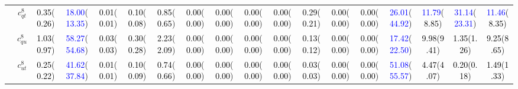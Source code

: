 \documentclass{article}
\begin{document}
\begin{landscape}
\begin{table}[H]
\begin{tabular}{|c|c|c|c|c|c|c|c|c|c|c|c|c|c|c|c|c|c|}
 & $c_{qt}^{8}$ & \textcolor{black}{0.35}(\textcolor{black}{0.26}) & \textcolor{blue}{18.00}(\textcolor{blue}{13.35}) & \textcolor{black}{0.01}(\textcolor{black}{0.01}) & \textcolor{black}{0.10}(\textcolor{black}{0.08}) & \textcolor{black}{0.85}(\textcolor{black}{0.65}) & \textcolor{black}{0.00}(\textcolor{black}{0.00}) & \textcolor{black}{0.00}(\textcolor{black}{0.00}) & \textcolor{black}{0.00}(\textcolor{black}{0.00}) & \textcolor{black}{0.00}(\textcolor{black}{0.00}) & \textcolor{black}{0.29}(\textcolor{black}{0.21}) & \textcolor{black}{0.00}(\textcolor{black}{0.00}) & \textcolor{black}{0.00}(\textcolor{black}{0.00}) & \textcolor{blue}{26.01}(\textcolor{blue}{44.92}) & \textcolor{blue}{11.79}(\textcolor{black}{8.85}) & \textcolor{blue}{31.14}(\textcolor{blue}{23.31}) & \textcolor{blue}{11.46}(\textcolor{black}{8.35})\\ \cline{2-18}
 & $c_{qu}^{8}$ & \textcolor{black}{1.03}(\textcolor{black}{0.97}) & \textcolor{blue}{58.27}(\textcolor{blue}{54.68}) & \textcolor{black}{0.03}(\textcolor{black}{0.03}) & \textcolor{black}{0.30}(\textcolor{black}{0.28}) & \textcolor{black}{2.23}(\textcolor{black}{2.09}) & \textcolor{black}{0.00}(\textcolor{black}{0.00}) & \textcolor{black}{0.00}(\textcolor{black}{0.00}) & \textcolor{black}{0.00}(\textcolor{black}{0.00}) & \textcolor{black}{0.00}(\textcolor{black}{0.00}) & \textcolor{black}{0.13}(\textcolor{black}{0.12}) & \textcolor{black}{0.00}(\textcolor{black}{0.00}) & \textcolor{black}{0.00}(\textcolor{black}{0.00}) & \textcolor{blue}{17.42}(\textcolor{blue}{22.50}) & \textcolor{black}{9.98}(\textcolor{black}{9.41}) & \textcolor{black}{1.35}(\textcolor{black}{1.26}) & \textcolor{black}{9.25}(\textcolor{black}{8.65})\\ \cline{2-18}
 & $c_{ut}^{8}$ & \textcolor{black}{0.25}(\textcolor{black}{0.22}) & \textcolor{blue}{41.62}(\textcolor{blue}{37.84}) & \textcolor{black}{0.01}(\textcolor{black}{0.01}) & \textcolor{black}{0.10}(\textcolor{black}{0.09}) & \textcolor{black}{0.74}(\textcolor{black}{0.66}) & \textcolor{black}{0.00}(\textcolor{black}{0.00}) & \textcolor{black}{0.00}(\textcolor{black}{0.00}) & \textcolor{black}{0.00}(\textcolor{black}{0.00}) & \textcolor{black}{0.00}(\textcolor{black}{0.00}) & \textcolor{black}{0.03}(\textcolor{black}{0.03}) & \textcolor{black}{0.00}(\textcolor{black}{0.00}) & \textcolor{black}{0.00}(\textcolor{black}{0.00}) & \textcolor{blue}{51.08}(\textcolor{blue}{55.57}) & \textcolor{black}{4.47}(\textcolor{black}{4.07}) & \textcolor{black}{0.20}(\textcolor{black}{0.18}) & \textcolor{black}{1.49}(\textcolor{black}{1.33})\\ \hline

\end{tabular}
\end{table}
\end{landscape}
\end{document}
